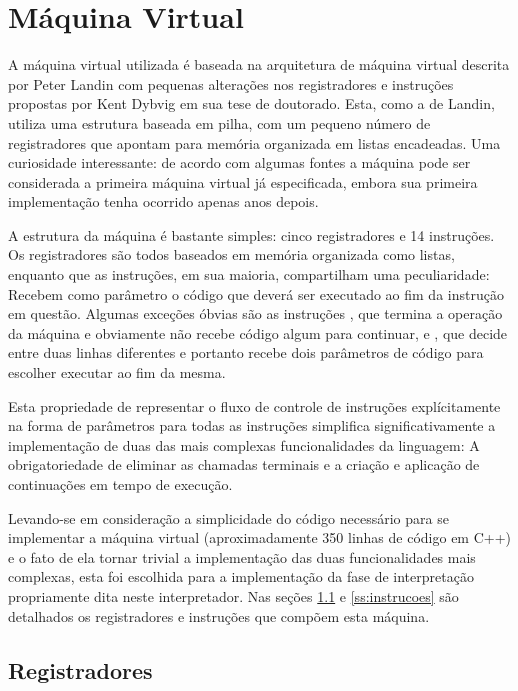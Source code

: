 \section{Máquina Virtual}
\label{sec:maquina-virtual}

A máquina virtual utilizada é baseada na arquitetura de máquina virtual
 descrita por Peter Landin\cite{secd} com pequenas alterações nos
registradores e instruções propostas por Kent Dybvig em sua tese de
doutorado\cite{3imp}. Esta, como a de Landin, utiliza uma estrutura baseada em pilha,
com um pequeno número de registradores que apontam para memória organizada em
listas encadeadas. Uma curiosidade interessante: de acordo com algumas fontes
\cite{craig:vm} a máquina  pode ser considerada a primeira máquina
virtual já especificada, embora sua primeira implementação tenha ocorrido apenas
anos depois.

A estrutura da máquina é bastante simples: cinco registradores e 14 instruções.
Os registradores são todos baseados em memória organizada como listas, enquanto
que as instruções, em sua maioria, compartilham uma peculiaridade: Recebem como parâmetro
o código que deverá ser executado ao fim da instrução em questão. Algumas
exceções óbvias são as instruções , que termina a operação da
máquina e obviamente não recebe código algum para continuar, e , que
decide entre duas linhas diferentes e portanto recebe dois parâmetros de código
para escolher executar ao fim da mesma.

Esta propriedade de representar o fluxo de controle de instruções
explícitamente na forma de parâmetros para todas as instruções simplifica
significativamente a implementação de duas das mais complexas funcionalidades
da linguagem: A obrigatoriedade de eliminar as chamadas terminais e a criação e
aplicação de continuações em tempo de execução.

Levando-se em consideração a simplicidade do código necessário para se
implementar a máquina virtual  (aproximadamente 350 linhas de código
em C++) e o fato de ela tornar trivial a implementação das duas funcionalidades
mais complexas, esta foi escolhida para a implementação da fase de
interpretação propriamente dita neste interpretador. Nas seções
\ref{ss:registradores} e \ref{ss:instrucoes} são detalhados os registradores e
instruções que compõem esta máquina.

\subsection{Registradores}
\label{ss:registradores}

